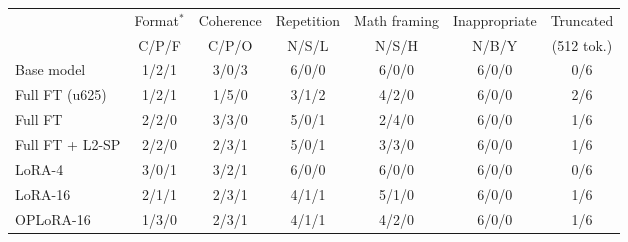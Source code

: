 \begin{tabular}{@{}l cccccc@{}}
\toprule
 & Format$^\ast$ & Coherence & Repetition & Math framing & Inappropriate & Truncated \\
 & C/P/F & C/P/O & N/S/L & N/S/H & N/B/Y & (512 tok.) \\
\midrule
Base model & 1/2/1 & 3/0/3 & 6/0/0 & 6/0/0 & 6/0/0 & 0/6 \\
Full FT (u625) & 1/2/1 & 1/5/0 & 3/1/2 & 4/2/0 & 6/0/0 & 2/6 \\
Full FT & 2/2/0 & 3/3/0 & 5/0/1 & 2/4/0 & 6/0/0 & 1/6 \\
Full FT + L2-SP & 2/2/0 & 2/3/1 & 5/0/1 & 3/3/0 & 6/0/0 & 1/6 \\
LoRA-4 & 3/0/1 & 3/2/1 & 6/0/0 & 6/0/0 & 6/0/0 & 0/6 \\
LoRA-16 & 2/1/1 & 2/3/1 & 4/1/1 & 5/1/0 & 6/0/0 & 1/6 \\
OPLoRA-16 & 1/3/0 & 2/3/1 & 4/1/1 & 4/2/0 & 6/0/0 & 1/6 \\
\bottomrule
\end{tabular}
